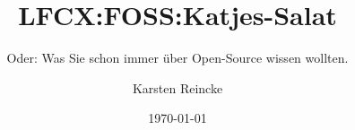 \documentclass[]{beamer}
\title{LFCX:FOSS:Katjes-Salat}
\subtitle{Oder: Was Sie schon immer über Open-Source wissen wollten.}
\institute{GS-LDK}
\author{Karsten Reincke}
\date{\today}
\def\cfgGl{../../../../cfg.gl/}
\begin{document}

\begin{frame}
  \titlepage
\end{frame}







\logo{}
\newpage



%
\end{document}
